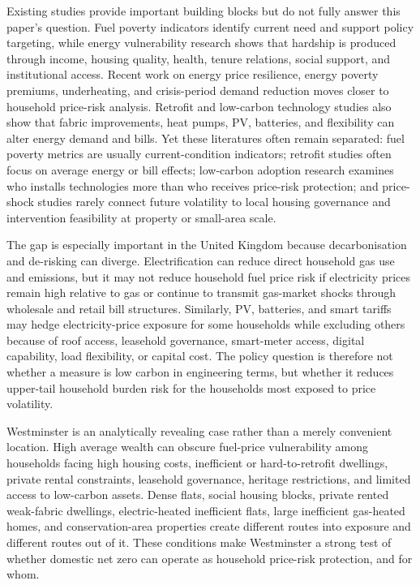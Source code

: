 Existing studies provide important building blocks but do not fully answer this paper's question. Fuel poverty indicators identify current need and support policy targeting, while energy vulnerability research shows that hardship is produced through income, housing quality, health, tenure relations, social support, and institutional access. Recent work on energy price resilience, energy poverty premiums, underheating, and crisis-period demand reduction moves closer to household price-risk analysis. Retrofit and low-carbon technology studies also show that fabric improvements, heat pumps, PV, batteries, and flexibility can alter energy demand and bills. Yet these literatures often remain separated: fuel poverty metrics are usually current-condition indicators; retrofit studies often focus on average energy or bill effects; low-carbon adoption research examines who installs technologies more than who receives price-risk protection; and price-shock studies rarely connect future volatility to local housing governance and intervention feasibility at property or small-area scale.

The gap is especially important in the United Kingdom because decarbonisation and de-risking can diverge. Electrification can reduce direct household gas use and emissions, but it may not reduce household fuel price risk if electricity prices remain high relative to gas or continue to transmit gas-market shocks through wholesale and retail bill structures. Similarly, PV, batteries, and smart tariffs may hedge electricity-price exposure for some households while excluding others because of roof access, leasehold governance, smart-meter access, digital capability, load flexibility, or capital cost. The policy question is therefore not whether a measure is low carbon in engineering terms, but whether it reduces upper-tail household burden risk for the households most exposed to price volatility.

Westminster is an analytically revealing case rather than a merely convenient location. High average wealth can obscure fuel-price vulnerability among households facing high housing costs, inefficient or hard-to-retrofit dwellings, private rental constraints, leasehold governance, heritage restrictions, and limited access to low-carbon assets. Dense flats, social housing blocks, private rented weak-fabric dwellings, electric-heated inefficient flats, large inefficient gas-heated homes, and conservation-area properties create different routes into exposure and different routes out of it. These conditions make Westminster a strong test of whether domestic net zero can operate as household price-risk protection, and for whom.


